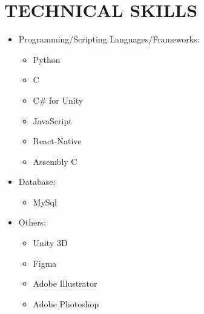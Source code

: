 \documentclass[paper=a4,fontsize=12pt]{scrartcl}
\newcommand{\NewPart}[1]{\section*{\uppercase{#1}}}
\begin{document}
\NewPart{Technical Skills}{}
\begin{itemize}
\item Programming/Scripting Languages/Frameworks:
	\begin{itemize}
		\item Python
		\item C
		\item C\# for Unity
		\item JavaScript 
		\item React-Native
		\item Assembly C
	\end{itemize}
\item Database:
	\begin{itemize}
		\item MySql
	\end{itemize}
\item Others:
	\begin{itemize}
		\item Unity 3D
		\item Figma
		\item Adobe Illustrator
		\item Adobe Photoshop
	\end{itemize}
\end{itemize}
\end{document}
